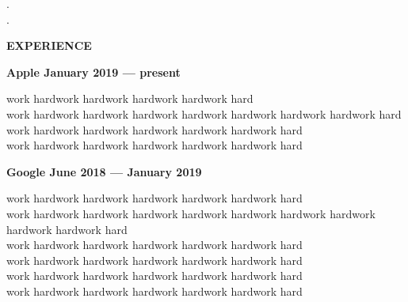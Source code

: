 \documentclass{article}
\begin{document}
.\\[10pt]


{\centering \noindent\makebox[\textwidth]{\rule{\paperwidth}{0.2pt}}}
.\\[10pt]


\begin{minipage}{0.3\textwidth}
  \begin{flushleft}
	\Large {\bf EXPERIENCE}
  \end{flushleft}
\end{minipage}
\begin{minipage}{0.7\textwidth}
  \begin{flushleft}
    \begin{flushleft}
            \bf{Apple January 2019 — present }
    \end{flushleft}
    
  \end{flushleft}

\begin{flushleft}
	    work hardwork hardwork hardwork hardwork hard\\
        work hardwork hardwork hardwork hardwork hardwork hardwork hardwork hard\\
        work hardwork hardwork hardwork hardwork hardwork hard\\
        work hardwork hardwork hardwork hardwork hardwork hard\\
\end{flushleft}

\begin{flushleft}
	    {\bf Google June 2018 — January 2019}\\
\end{flushleft}	    
	    

    \begin{flushleft}
	    work hardwork hardwork hardwork hardwork hardwork hard\\
        work hardwork hardwork hardwork hardwork hardwork hardwork hardwork hardwork hardwork hard\\
        work hardwork hardwork hardwork hardwork hardwork hard\\
        work hardwork hardwork hardwork hardwork hardwork hard\\
        work hardwork hardwork hardwork hardwork hardwork hard\\
        work hardwork hardwork hardwork hardwork hardwork hard\\
    \end{flushleft}
\end{minipage}
\end{document}

